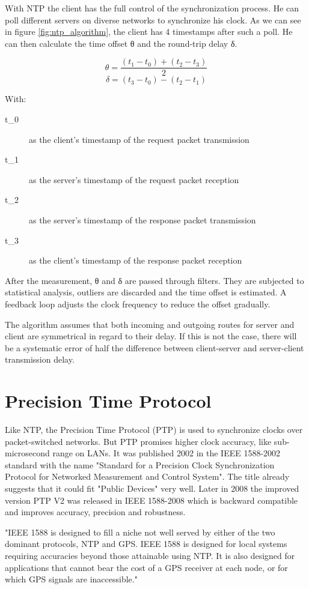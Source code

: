 With NTP the client has the full control of the synchronization process. He can poll different servers on diverse networks to synchronize his clock. As we can see in figure \ref{fig:ntp_algorithm}, the client has 4 timestamps after such a poll. He can then calculate the time offset θ and the round-trip delay δ.

\[ \theta = \frac{(t_1 - t_0) + (t_2 - t_3)}{2} \]
\[ \delta = (t_3 - t_0) - (t_2 - t_1) \]

With:
\begin{description}
    \item[t_0] as the client's timestamp of the request packet transmission
    \item[t_1] as the server's timestamp of the request packet reception
    \item[t_2] as the server's timestamp of the response packet transmission
    \item[t_3] as the client's timestamp of the response packet reception
\end{description}

After the measurement, θ and δ are passed through filters. They are subjected to statistical analysis, outliers are discarded and the time offset is estimated. A feedback loop adjusts the clock frequency to reduce the offset gradually.

The algorithm assumes that both incoming and outgoing routes for server and client are symmetrical in regard to their delay. If this is not the case, there will be a systematic error of half the difference between client-server and server-client transmission delay.

\section{Precision Time Protocol}

Like NTP, the Precision Time Protocol (PTP) is used to synchronize clocks over packet-switched networks. But PTP promises higher clock accuracy, like sub-microsecond range on LANs. It was published 2002 in the IEEE 1588-2002 standard with the name "Standard for a Precision Clock Synchronization Protocol for Networked Measurement and Control System". The title already suggests that it could fit "Public Devices" very well. Later in 2008 the improved version PTP V2 was released in IEEE 1588-2008 which is backward compatible and improves accuracy, precision and robustness.

"IEEE 1588 is designed to fill a niche not well served by either of the two dominant protocols, NTP and GPS. IEEE 1588 is designed for local systems requiring accuracies beyond those attainable using NTP. It is also designed for applications that cannot bear the cost of a GPS receiver at each node, or for which GPS signals are inaccessible."

